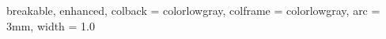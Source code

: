 {
  breakable,
  enhanced,
  colback  = colorlowgray,
  colframe = colorlowgray,
  arc      = 3mm,
  width    = 1.0 \linewidth
}



